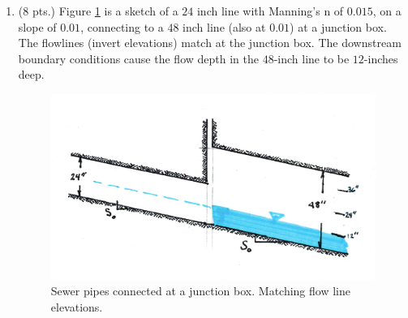 \documentclass[11pt]{article}
\begin{document}
\begin{enumerate}
\clearpage
\item (8 pts.)
Figure \ref{fig:SewerPipeMatchFlowline} is a sketch of a $24$ inch line with Manning's n of $0.015$, on a slope of $0.01$, connecting to a $48$ inch line (also at $0.01$) at a junction box.   The flowlines (invert elevations) match at the junction box.  The downstream boundary conditions cause the flow depth in the $48$-inch line to be $12$-inches deep.

\begin{figure}[h!] %
\centering
   \includegraphics[width=5in]{SewerPipeMatchFlowline.jpg}
   \caption{Sewer pipes connected at a junction box.  Matching flow line elevations.}
   \label{fig:SewerPipeMatchFlowline} 
\end{figure}


\end{enumerate}
\end{document}
